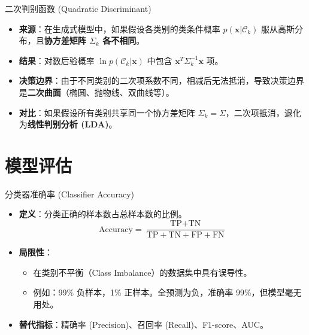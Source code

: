 \documentclass[12pt, aspectratio=169]{beamer}
\newcommand{\vect}[1]{\mathbf{#1}}
\begin{document}
\begin{frame}{二次判别函数 (Quadratic Discriminant)}
    \begin{itemize}
        \item \textbf{来源}：在生成式模型中，如果假设各类别的类条件概率 $p(\vect{x}|\mathcal{C}_k)$ 服从高斯分布，且\textbf{协方差矩阵 $\Sigma_k$ 各不相同}。
        \item \textbf{结果}：对数后验概率 $\ln p(\mathcal{C}_k|\vect{x})$ 中包含 $\vect{x}^T \Sigma_k^{-1} \vect{x}$ 项。
        \item \textbf{决策边界}：由于不同类别的二次项系数不同，相减后无法抵消，导致决策边界是\textbf{二次曲面}（椭圆、抛物线、双曲线等）。
        \item \textbf{对比}：如果假设所有类别共享同一个协方差矩阵 $\Sigma_k = \Sigma$，二次项抵消，退化为\textbf{线性判别分析 (LDA)}。
    \end{itemize}
\end{frame}

\section{模型评估}

\begin{frame}{分类器准确率 (Classifier Accuracy)}
    \begin{itemize}
        \item \textbf{定义}：分类正确的样本数占总样本数的比例。
        $$ \text{Accuracy} = \frac{\text{TP} + \text{TN}}{\text{TP} + \text{TN} + \text{FP} + \text{FN}} $$
        \item \textbf{局限性}：
        \begin{itemize}
            \item 在类别不平衡（Class Imbalance）的数据集中具有误导性。
            \item 例如：99\% 负样本，1\% 正样本。全预测为负，准确率 99\%，但模型毫无用处。
        \end{itemize}
        \item \textbf{替代指标}：精确率 (Precision)、召回率 (Recall)、F1-score、AUC。
    \end{itemize}
\end{frame}
\end{document}
